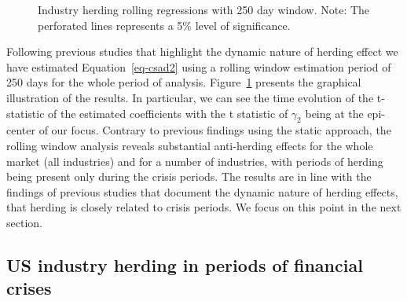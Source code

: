 \documentclass[
  letterpaper,
  DIV=11,
  numbers=noendperiod]{scrartcl}
\begin{document}
\begin{figure}[H]


\caption{\label{fig-rol_gen}Industry herding rolling regressions with
250 day window. Note: The perforated lines represents a 5\% level of
significance.}

\end{figure}%

Following previous studies that highlight the dynamic nature of herding
effect \citep{babalos2015commodity, klein2013time, mohamad2022birds} we
have estimated Equation~\ref{eq-csad2} using a rolling window estimation
period of 250 days for the whole period of analysis.
Figure~\ref{fig-rol_gen} presents the graphical illustration of the
results. In particular, we can see the time evolution of the t-statistic
of the estimated coefficients with the t statistic of \(\gamma_2\) being
at the epi-center of our focus. Contrary to previous findings using the
static approach, the rolling window analysis reveals substantial
anti-herding effects for the whole market (all industries) and for a
number of industries, with periods of herding being present only during
the crisis periods. The results are in line with the findings of
previous studies that document the dynamic nature of herding effects,
that herding is closely related to crisis periods. We focus on this
point in the next section.

\subsection{US industry herding in periods of financial
crises}\label{us-industry-herding-in-periods-of-financial-crises}
\end{document}
